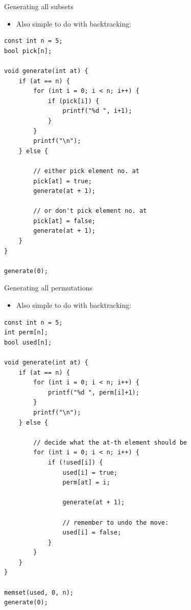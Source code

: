 \documentclass{beamer}
\begin{document}
\begin{frame}{Generating all subsets}
    \begin{itemize}
        \item Also simple to do with backtracking:
    \end{itemize}
    \begin{verbatim}
const int n = 5;
bool pick[n];

void generate(int at) {
    if (at == n) {
        for (int i = 0; i < n; i++) {
            if (pick[i]) {
                printf("%d ", i+1);
            }
        }
        printf("\n");
    } else {

        // either pick element no. at
        pick[at] = true;
        generate(at + 1);

        // or don't pick element no. at
        pick[at] = false;
        generate(at + 1);
    }
}

generate(0);
    \end{verbatim}
\end{frame}


\begin{frame}{Generating all permutations}
    \begin{itemize}
        \item Also simple to do with backtracking:
    \end{itemize}
    \begin{verbatim}
const int n = 5;
int perm[n];
bool used[n];

void generate(int at) {
    if (at == n) {
        for (int i = 0; i < n; i++) {
            printf("%d ", perm[i]+1);
        }
        printf("\n");
    } else {

        // decide what the at-th element should be
        for (int i = 0; i < n; i++) {
            if (!used[i]) {
                used[i] = true;
                perm[at] = i;

                generate(at + 1);

                // remember to undo the move:
                used[i] = false;
            }
        }
    }
}

memset(used, 0, n);
generate(0);
    \end{verbatim}
\end{frame}
\end{document}
